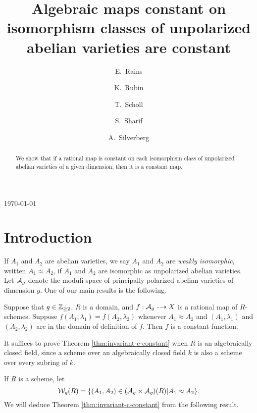 \documentclass{amsart}
\title[Algebraic maps constant on unpolarized isomorphism classes]{Algebraic maps constant on isomorphism classes of unpolarized abelian varieties are constant}
\author[E.\ Rains]{E.\ Rains}
\author[K.\ Rubin]{K.\ Rubin}
\author[T.\ Scholl]{T.\ Scholl}
\author[S.\ Sharif]{S.\ Sharif}
\author[A.\ Silverberg]{A.\ Silverberg}
\begin{document}
\begin{abstract}
We show that if a %
rational map is constant on each isomorphism class of unpolarized abelian varieties of a given dimension, then it is a constant map. 
\end{abstract}


\today
\maketitle



\section{Introduction}
\label{sec:introduction}

If $A_1$ and $A_2$ are abelian varieties, we say $A_1$ and $A_2$ are \emph{weakly isomorphic}, written $A_1 \approx A_2$, if $A_1$ and $A_2$ are isomorphic as unpolarized abelian varieties. Let $\mathcal{A}_g$ denote the moduli space of principally polarized abelian varieties of dimension $g$. One of our main results is the following.
\begin{theorem}\label{thm:invariant-c-constant}
  Suppose that $g\in\mathbb{Z}_{\ge 2}$, $R$ is a domain, and $f: \mathcal{A}_g \dashrightarrow X$ is a rational map of $R$-schemes. Suppose $f(A_1,\lambda_1) = f(A_2,\lambda_2)$ whenever $A_1 \approx A_2$ and $(A_1,\lambda_1)$ and $(A_2,\lambda_2)$ are in the domain of definition of $f$. Then $f$ is a constant function.
\end{theorem}

It suffices to prove Theorem \ref{thm:invariant-c-constant} when $R$ is an algebraically closed field, since a scheme over an algebraically closed field $k$ is also a scheme over every subring of $k$.




If $R$ is a scheme, let
$$
\mathcal{W}_g(R) = \{(A_1,A_2) \in (\mathcal{A}_g \times \mathcal{A}_g)(R) | A_1 \approx A_2\}.
$$
We will deduce Theorem \ref{thm:invariant-c-constant} from the following result.
\end{document}
